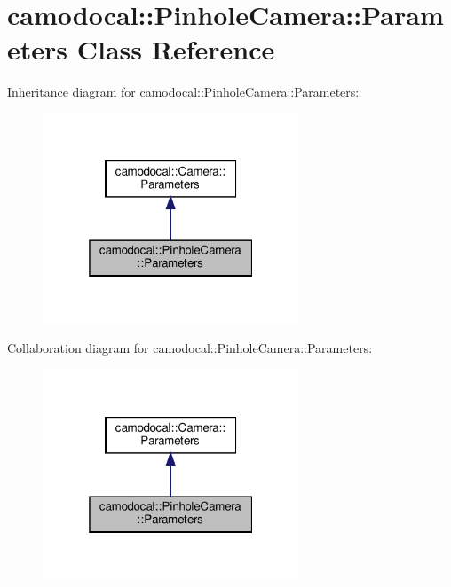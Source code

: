 \hypertarget{classcamodocal_1_1PinholeCamera_1_1Parameters}{}\section{camodocal\+:\+:Pinhole\+Camera\+:\+:Parameters Class Reference}
\label{classcamodocal_1_1PinholeCamera_1_1Parameters}


Inheritance diagram for camodocal\+:\+:Pinhole\+Camera\+:\+:Parameters\+:\nopagebreak
\begin{figure}[H]
\begin{center}
\leavevmode
\includegraphics[width=217pt]{classcamodocal_1_1PinholeCamera_1_1Parameters__inherit__graph}
\end{center}
\end{figure}


Collaboration diagram for camodocal\+:\+:Pinhole\+Camera\+:\+:Parameters\+:\nopagebreak
\begin{figure}[H]
\begin{center}
\leavevmode
\includegraphics[width=217pt]{classcamodocal_1_1PinholeCamera_1_1Parameters__coll__graph}
\end{center}
\end{figure}

